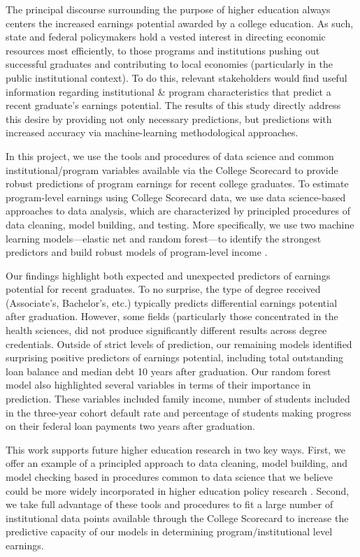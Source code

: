 \documentclass[a4paper, 12pt]{article}
\begin{document}
The principal discourse surrounding the purpose of higher education
always centers the increased earnings potential awarded by a college
education. As such, state and federal policymakers hold a vested
interest in directing economic resources most efficiently, to those
programs and institutions pushing out successful graduates and
contributing to local economies (particularly in the public
institutional context). To do this, relevant stakeholders would find
useful information regarding institutional \& program characteristics
that predict a recent graduate's earnings potential. The results of
this study directly address this desire by providing not only
necessary predictions, but predictions with increased accuracy via
machine-learning methodological approaches.

In this project, we use the tools and procedures of data science and
common institutional/program variables available via the College
Scorecard to provide robust predictions of program earnings for recent
college graduates. To estimate program-level earnings using College
Scorecard data, we use data science-based approaches to data analysis,
which are characterized by principled procedures of data cleaning,
model building, and testing. More specifically, we use two machine
learning models---elastic net and random forest---to identify the
strongest predictors and build robust models of program-level income
\parencite{Hastie_etal_2016, Kuhn_Silge_2022}.

Our findings highlight both expected and unexpected predictors of
earnings potential for recent graduates. To no surprise, the type of
degree received (Associate's, Bachelor's, etc.) typically predicts
differential earnings potential after graduation. However, some fields
(particularly those concentrated in the health sciences, did not
produce significantly different results across degree
credentials. Outside of strict levels of prediction, our remaining
models identified surprising positive predictors of earnings
potential, including total outstanding loan balance and median debt 10
years after graduation. Our random forest model also highlighted
several variables in terms of their importance in prediction. These
variables included family income, number of students included in the
three-year cohort default rate and percentage of students making
progress on their federal loan payments two years after graduation.

This work supports future higher education research in two key
ways. First, we offer an example of a principled approach to data
cleaning, model building, and model checking based in procedures
common to data science that we believe could be more widely
incorporated in higher education policy research
\parencite{Kuhn_Silge_2022}. Second, we take full advantage of these
tools and procedures to fit a large number of institutional data
points available through the College Scorecard to increase the
predictive capacity of our models in determining program/institutional
level earnings.
\end{document}
